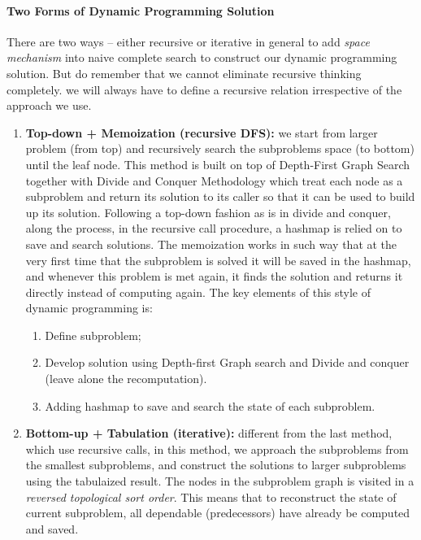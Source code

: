 \documentclass[../main.tex]{subfiles}
\begin{document}
\paragraph{Two Forms of Dynamic Programming Solution}
There are two ways -- either recursive or iterative in general to add \textit{space mechanism} into naive complete search  to construct our dynamic programming solution. But do remember that we cannot eliminate recursive thinking completely. we will always have to define a recursive relation irrespective of the approach we use.
\begin{enumerate}
    \item \textbf{Top-down + Memoization (recursive DFS):} we start from larger problem (from top) and recursively search the subproblems space (to bottom) until the leaf node. This method is built on top of Depth-First Graph Search together with Divide and Conquer Methodology which treat each node as a subproblem and return its solution to its caller so that it can be used to build up its solution. Following a top-down fashion as is in divide and conquer, along the process, in the recursive call procedure, a hashmap is relied on to save and search solutions. The memoization works in such way that at the very first time that the subproblem is solved it will be saved in the hashmap, and whenever this problem is met again, it finds the solution and returns it directly instead of computing again. The key elements of this style of dynamic programming is:
    \begin{enumerate}
        \item Define subproblem;
        \item Develop solution using Depth-first Graph search and Divide and conquer (leave alone the recomputation).
        \item Adding hashmap to save and search the state of each subproblem.
    \end{enumerate}%
    \item \textbf{Bottom-up + Tabulation (iterative):} different from the last method,  which use recursive calls, in this method, we approach the subproblems from the smallest subproblems, and construct the solutions to larger subproblems using the tabulaized result. The nodes in the subproblem graph is visited in a \textit{reversed topological sort order}. This means that to reconstruct the state of current subproblem, all dependable (predecessors) have already be computed and saved. 
\end{enumerate}
\end{document}
